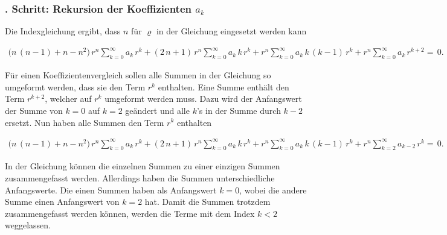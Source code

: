 \subsubsection{. Schritt: Rekursion der Koeffizienten $a_k$}
\begin{normalsize}%
Die Indexgleichung ergibt, dass $n$ f\"ur $\varrho$ in der Gleichung  eingesetzt werden kann
\end{normalsize}
\begin{align}
	\biggl(
	n \, \left( n - 1 \right)
	+
	n
	-
	n^2
	\biggr)
	\, r^{n}
	\sum_{k=0}^{\infty} a_k \, r^k
	+
	\left(	
	2 \, n
	+
	1
	\right)
	\, r^{n}
	\sum_{k=0}^{\infty} a_k \, k \, r^k
	+
	r^{n}
	\sum_{k=0}^{\infty} a_k \, k \, \left( k - 1 \right) \, r^k
	+
	r^{n}
	\sum_{k=0}^{\infty} a_k \, r^{k + 2}
	= \, 0
	\label{eq:bessel:potenzreihe:dgl:index:eingesetzt}
	\text{.}
\end{align}
\begin{normalsize}%
F\"ur einen Koeffizientenvergleich sollen alle Summen in der Gleichung  so umgeformt werden,
dass sie den Term $r^k$ enthalten.
Eine Summe enth\"alt den Term $r^{k + 2}$,
welcher auf $r^k$ umgeformt werden muss.
Dazu wird der Anfangswert der Summe von $k = 0$ auf $k = 2$ ge\"andert und alle $k$'s in der Summe durch $k - 2$ ersetzt.
Nun haben alle Summen den Term $r^k$ enthalten
\end{normalsize}
\begin{align}
	\biggl(
	n \, \left( n - 1 \right)
	+
	n
	-
	n^2
	\biggr)
	\, r^{n}
	\sum_{k=0}^{\infty} a_k \, r^k
	+
	\left(	
	2 \, n
	+
	1
	\right)
	\, r^{n}
	\sum_{k=0}^{\infty} a_k \, k \, r^k
	+
	r^{n}
	\sum_{k=0}^{\infty} a_k \, k \, \left( k - 1 \right) \, r^k
	+
	r^{n}
	\sum_{k=2}^{\infty} a_{k - 2} \, r^k
	= \, 0
	\label{eq:bessel:potenzreihe:dgl:index:eingesetzt:gleichesummen}
	\text{.}
\end{align}
\begin{normalsize}%
In der Gleichung  k\"onnen die einzelnen Summen zu einer einzigen Summen zusammengefasst werden.
Allerdings haben die Summen unterschiedliche Anfangswerte.
Die einen Summen haben als Anfangswert $k = 0$,
wobei die andere Summe einen Anfangswert von $k = 2$ hat.
Damit die Summen trotzdem zusammengefasst werden k\"onnen,
werden die Terme mit dem Index $k < 2$ weggelassen.
\end{normalsize}
